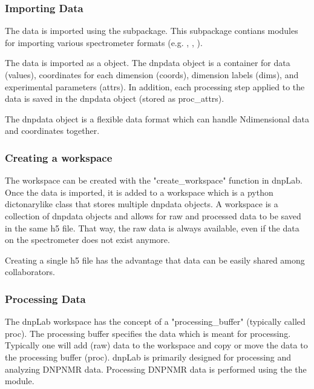 \documentclass[letterpaper,10pt,english]{sphinxmanual}
\begin{document}
\subsubsection{Importing Data}
\label{\detokenize{introduction:importing-data}}
The data is imported using the {\hyperref[\detokenize{dnpImport:import}]{}} sub\sphinxhyphen{}package. This sub\sphinxhyphen{}package contians modules for importing various spectrometer formats (e.g. {\hyperref[\detokenize{dnpImport:topspin}]{}}, {\hyperref[\detokenize{dnpImport:vnmrj}]{}}, {\hyperref[\detokenize{dnpImport:prospa}]{}}).

The data is imported as a {\hyperref[\detokenize{dnpData:dnpdata}]{}} object. The dnpdata object is a container for data (values), coordinates for each dimension (coords), dimension labels (dims), and experimental parameters (attrs). In addition, each processing step applied to the data is saved in the dnpdata object (stored as proc\_attrs).

The dnpdata object is a flexible data format which can handle N\sphinxhyphen{}dimensional data and coordinates together.


\subsubsection{Creating a workspace}
\label{\detokenize{introduction:creating-a-workspace}}
The workspace can be created with the "create\_workspace" function in dnpLab. Once the data is imported, it is added to a workspace which is a python dictonary\sphinxhyphen{}like class that stores multiple dnpdata objects. A workspace is a collection of dnpdata objects and allows for raw and processed data to be saved in the same h5 file. That way, the raw data is always available, even if the data on the spectrometer does not exist anymore.

Creating a single h5 file has the advantage that data can be easily shared among collaborators.


\subsubsection{Processing Data}
\label{\detokenize{introduction:processing-data}}
The dnpLab workspace has the concept of a "processing\_buffer" (typically called proc). The processing buffer specifies the data which is meant for processing. Typically one will add (raw) data to the workspace and copy or move the data to the processing buffer (proc). dnpLab is primarily designed for processing and analyzing DNP\sphinxhyphen{}NMR data. Processing DNP\sphinxhyphen{}NMR data is performed using the the {\hyperref[\detokenize{dnpNMR:dnpnmr}]{}} module.
\end{document}
